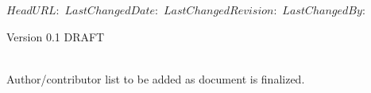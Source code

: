 \svnidlong
{$HeadURL: $}
{$LastChangedDate: $}
{$LastChangedRevision: $}
{$LastChangedBy: $}


\thispagestyle{empty}%
{\noindent Version 0.1 DRAFT}
\vspace*{\fill}
\begin{fullwidth}
\sffamily
{
  \huge
  \smallcaps
  \@title
}\\
\vspace{4\baselineskip}
{\Large 
\noindent
% 
Author/contributor list to be added as document is finalized.
}\\
\vspace{4\baselineskip}
\noindent
\@date\\
\vspace{\baselineskip}
\end{fullwidth}
\vspace*{\fill}
